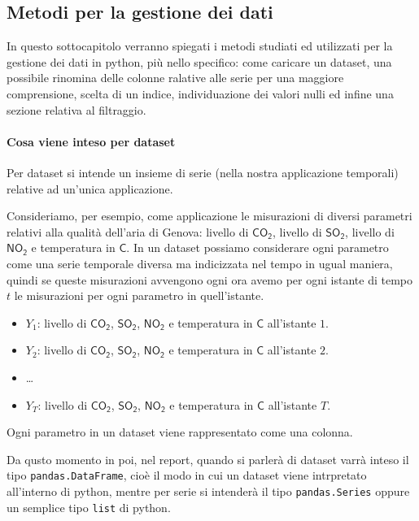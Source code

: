 \subsection{Metodi per la gestione dei dati}
In questo sottocapitolo verranno spiegati i metodi studiati ed utilizzati per la gestione dei
dati in python, più nello specifico: come caricare un dataset, una possibile rinomina delle
colonne ralative alle serie per una maggiore comprensione, scelta di un indice, individuazione dei valori
nulli ed infine una sezione relativa al filtraggio.

\paragraph{Cosa viene inteso per dataset} Per dataset si intende un insieme di
serie (nella nostra applicazione temporali) relative ad un'unica applicazione.

\begin{esempio}
    Consideriamo, per esempio, come applicazione le misurazioni di diversi parametri
    relativi alla qualità dell'aria di Genova: livello di $\mathsf{CO_2}$,
    livello di $\mathsf{SO_2}$, livello di $\mathsf{NO_2}$ e temperatura in \textdegree$\mathsf{C}$.
    In un dataset possiamo considerare ogni parametro come una serie temporale diversa ma indicizzata
    nel tempo in ugual maniera, quindi se queste misurazioni avvengono ogni ora avemo
    per ogni istante di tempo $t$ le misurazioni per ogni parametro in quell'istante.
    \begin{itemize}
        \setlength\itemsep{-0.5em}
        \item $Y_1$: livello di $\mathsf{CO_2}$, $\mathsf{SO_2}$, $\mathsf{NO_2}$ e temperatura in \textdegree$\mathsf{C}$ all'istante $1$.
        \item $Y_2$: livello di $\mathsf{CO_2}$, $\mathsf{SO_2}$, $\mathsf{NO_2}$ e temperatura in \textdegree$\mathsf{C}$ all'istante $2$.
        \item \dots
        \item $Y_T$: livello di $\mathsf{CO_2}$, $\mathsf{SO_2}$, $\mathsf{NO_2}$ e temperatura in \textdegree$\mathsf{C}$ all'istante $T$.
    \end{itemize}
    Ogni parametro in un dataset viene rappresentato come una colonna.
\end{esempio}
Da qusto momento in poi, nel report, quando si parlerà di dataset varrà inteso il tipo
\texttt{pandas.DataFrame}, cioè il modo in cui un dataset viene intrpretato all'interno
di python, mentre per serie si intenderà il tipo \texttt{pandas.Series} oppure un semplice
tipo \texttt{list} di python.


